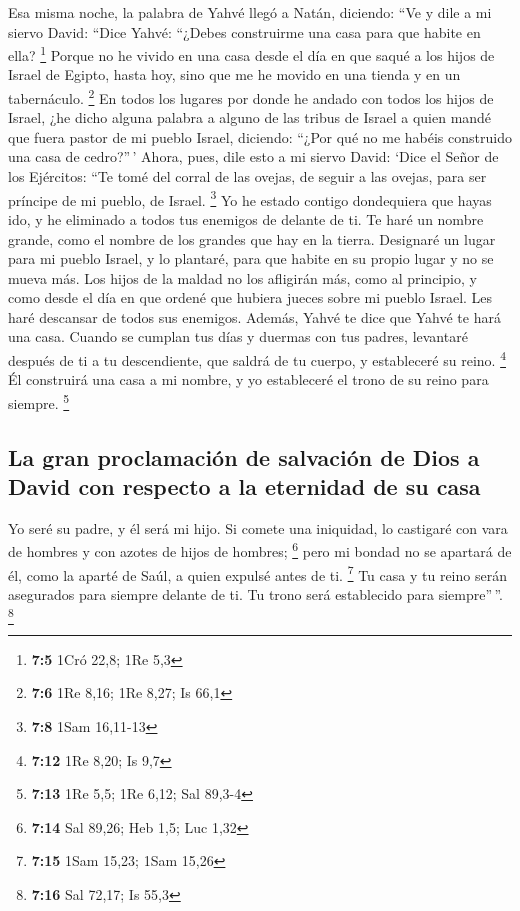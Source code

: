 \begin{paracol}{2}
 Esa misma noche, la palabra de Yahvé llegó a Natán,
diciendo:  ``Ve y dile a mi siervo David: ``Dice Yahvé:
``¿Debes construirme una casa para que habite en ella? \footnote{\textbf{7:5}
  1Cró 22,8; 1Re 5,3}  Porque no he vivido en una casa
desde el día en que saqué a los hijos de Israel de Egipto, hasta hoy,
sino que me he movido en una tienda y en un tabernáculo. \footnote{\textbf{7:6}
  1Re 8,16; 1Re 8,27; Is 66,1}  En todos los lugares por
donde he andado con todos los hijos de Israel, ¿he dicho alguna palabra
a alguno de las tribus de Israel a quien mandé que fuera pastor de mi
pueblo Israel, diciendo: ``¿Por qué no me habéis construido una casa de
cedro?''\,'  Ahora, pues, dile esto a mi siervo David:
`Dice el Señor de los Ejércitos: ``Te tomé del corral de las ovejas, de
seguir a las ovejas, para ser príncipe de mi pueblo, de Israel.
\footnote{\textbf{7:8} 1Sam 16,11-13}  Yo he estado
contigo dondequiera que hayas ido, y he eliminado a todos tus enemigos
de delante de ti. Te haré un nombre grande, como el nombre de los
grandes que hay en la tierra.  Designaré un lugar para mi
pueblo Israel, y lo plantaré, para que habite en su propio lugar y no se
mueva más. Los hijos de la maldad no los afligirán más, como al
principio,  y como desde el día en que ordené que hubiera
jueces sobre mi pueblo Israel. Les haré descansar de todos sus enemigos.
Además, Yahvé te dice que Yahvé te hará una casa.  Cuando
se cumplan tus días y duermas con tus padres, levantaré después de ti a
tu descendiente, que saldrá de tu cuerpo, y estableceré su reino.
\footnote{\textbf{7:12} 1Re 8,20; Is 9,7}  Él construirá
una casa a mi nombre, y yo estableceré el trono de su reino para
siempre. \footnote{\textbf{7:13} 1Re 5,5; 1Re 6,12; Sal 89,3-4}

\hypertarget{la-gran-proclamaciuxf3n-de-salvaciuxf3n-de-dios-a-david-con-respecto-a-la-eternidad-de-su-casa}{%
\subsection{La gran proclamación de salvación de Dios a David con
respecto a la eternidad de su
casa}\label{la-gran-proclamaciuxf3n-de-salvaciuxf3n-de-dios-a-david-con-respecto-a-la-eternidad-de-su-casa}}

 Yo seré su padre, y él será mi hijo. Si comete una
iniquidad, lo castigaré con vara de hombres y con azotes de hijos de
hombres; \footnote{\textbf{7:14} Sal 89,26; Heb 1,5; Luc 1,32}
 pero mi bondad no se apartará de él, como la aparté de
Saúl, a quien expulsé antes de ti. \footnote{\textbf{7:15} 1Sam 15,23;
  1Sam 15,26}  Tu casa y tu reino serán asegurados para
siempre delante de ti. Tu trono será establecido para siempre''\,''.
\footnote{\textbf{7:16} Sal 72,17; Is 55,3}


\end{paracol}
